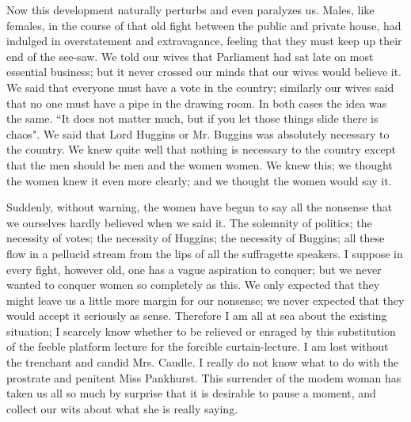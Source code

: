 \documentclass[final,10pt,letterpaper,twocolumn,openany]{book}
\begin{document}
Now this development naturally perturbs and even paralyzes us. Males,
like females, in the course of that old fight between the public and private
house, had indulged in overstatement and extravagance, feeling that they
must keep up their end of the see-saw. We told our wives that Parliament
had sat late on most essential business; but it never crossed our minds that
our wives would believe it. We said that everyone must have a vote in the
country; similarly our wives said that no one must have a pipe in the
drawing room. In both cases the idea was the same. ``It does not matter
much, but if you let those things slide there is chaos". We said that Lord
Huggins or Mr. Buggins was absolutely necessary to the country. We knew
quite well that nothing is necessary to the country except that the men
should be men and the women women. We knew this; we thought the
women knew it even more clearly; and we thought the women would say
it. 

Suddenly, without warning, the women have begun to say all the
nonsense that we ourselves hardly believed when we said it. The
solemnity of politics; the necessity of votes; the necessity of Huggins; the
necessity of Buggins; all these flow in a pellucid stream from the lips of
all the suffragette speakers. I suppose in every fight, however old, one has
a vague aspiration to conquer; but we never wanted to conquer women so
completely as this. We only expected that they might leave us a little more
margin for our nonsense; we never expected that they would accept it
seriously as sense. Therefore I am all at sea about the existing situation; I
scarcely know whether to be relieved or enraged by this substitution of the
feeble platform lecture for the forcible curtain-lecture. I am lost without
the trenchant and candid Mrs. Caudle. I really do not know what to do
with the prostrate and penitent Miss Pankhurst. This surrender of the
modem woman has taken us all so much by surprise that it is desirable to
pause a moment, and collect our wits about what she is really saying.
\end{document}
